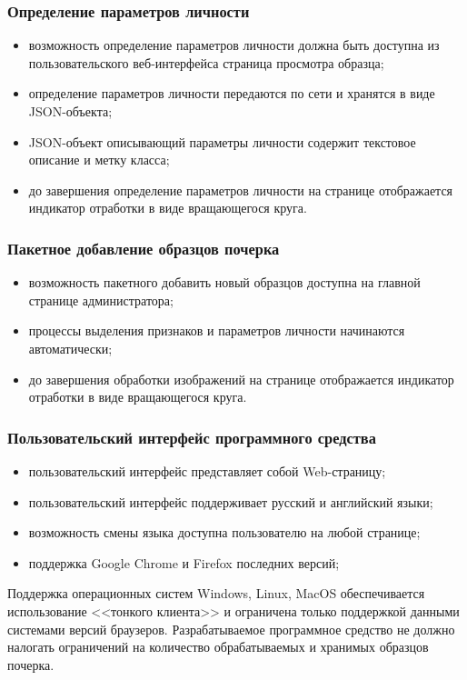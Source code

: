 \subsubsection{Определение параметров личности}
\label{sec:freq:psiho_analysis}
\begin{itemize}
	\item возможность определение параметров личности должна быть доступна из пользовательского веб-интерфейса страница просмотра образца;
	\item определение параметров личности передаются по сети и хранятся в виде JSON-объекта;
	\item JSON-объект описывающий параметры личности содержит текстовое описание и метку класса;
	\item до завершения определение параметров личности на странице отображается индикатор отработки в виде вращающегося круга.
\end{itemize}

\subsubsection{Пакетное добавление образцов почерка}
\label{sec:freq:package_add}
\begin{itemize}
	\item возможность пакетного добавить новый образцов доступна на главной странице администратора;
	\item процессы выделения признаков и параметров личности начинаются автоматически;
	\item до завершения обработки изображений на странице отображается индикатор отработки в виде вращающегося круга.
\end{itemize}

\subsubsection{Пользовательский интерфейс программного средства}
\begin{itemize}
	\item пользовательский интерфейс представляет собой Web-страницу;
	\item пользовательский интерфейс поддерживает русский и английский языки;
	\item возможность смены языка доступна пользователю на любой странице;
	\item поддержка Google Chrome и Firefox последних версий;
\end{itemize}

Поддержка операционных систем Windows, Linux, MacOS обеспечивается использование <<тонкого клиента>> и ограничена только поддержкой данными системами версий браузеров.
Разрабатываемое программное средство не должно налогать ограничений на количество обрабатываемых и хранимых образцов почерка.